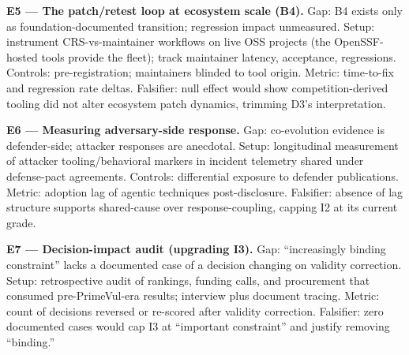 \textbf{E5 --- The patch/retest loop at ecosystem scale (B4).}
Gap: B4 exists only as foundation-documented transition; regression impact unmeasured.
Setup: instrument CRS-vs-maintainer workflows on live OSS projects (the OpenSSF-hosted tools
provide the fleet); track maintainer latency, acceptance, regressions. Controls:
pre-registration; maintainers blinded to tool origin. Metric: time-to-fix and regression rate
deltas. Falsifier: null effect would show competition-derived tooling did not alter ecosystem
patch dynamics, trimming D3's interpretation.

\textbf{E6 --- Measuring adversary-side response.}
Gap: co-evolution evidence is defender-side; attacker responses are anecdotal. Setup:
longitudinal measurement of attacker tooling/behavioral markers in incident telemetry
shared under defense-pact agreements. Controls: differential exposure to defender
publications. Metric: adoption lag of agentic techniques post-disclosure. Falsifier: absence
of lag structure supports shared-cause over response-coupling, capping I2 at its current grade.

\textbf{E7 --- Decision-impact audit (upgrading I3).}
Gap: ``increasingly binding constraint'' lacks a documented case of a decision changing on
validity correction. Setup: retrospective audit of rankings, funding calls, and procurement
that consumed pre-PrimeVul-era results; interview plus document tracing. Metric: count of
decisions reversed or re-scored after validity correction. Falsifier: zero documented cases
would cap I3 at ``important constraint'' and justify removing ``binding.''
